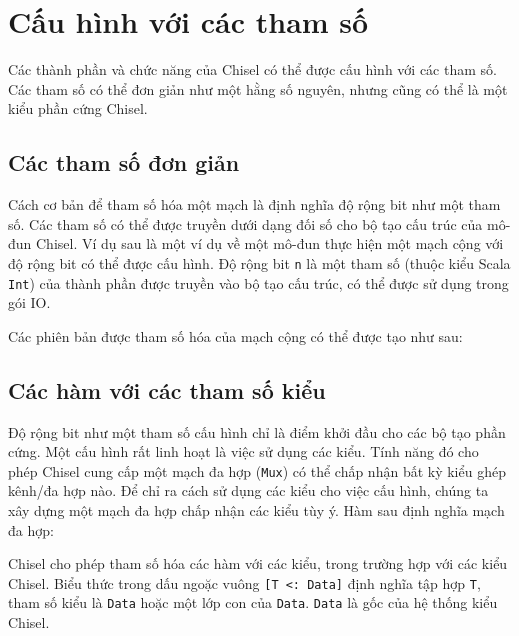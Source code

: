 \documentclass[%
    10pt,
    headinclude, footexclude,
    openright, %
    notitlepage,
    cleardoubleempty,
    headsepline,
    pointlessnumbers,
    bibtotoc, idxtotoc,
    ]{scrbook}
\newcommand{\code}[1]{{\small{\texttt{#1}}}}
\begin{document}

\section{Cấu hình với các tham số}

Các thành phần và chức năng của Chisel có thể được cấu hình với các tham số. Các tham số có thể đơn giản như một hằng số nguyên, nhưng cũng có thể là một kiểu phần cứng Chisel. 

\subsection{Các tham số đơn giản}

Cách cơ bản để tham số hóa một mạch là định nghĩa độ rộng bit như một tham số. Các tham số có thể được truyền dưới dạng đối số cho bộ tạo cấu trúc của mô-đun Chisel. Ví dụ sau là một ví dụ về một mô-đun thực hiện một mạch cộng với độ rộng bit có thể được cấu hình. Độ rộng bit \code{n} là một tham số (thuộc kiểu Scala \code{Int}) của thành phần được truyền vào bộ tạo cấu trúc, có thể được sử dụng trong gói IO. 


\noindent Các phiên bản được tham số hóa của mạch cộng có thể được tạo như sau:


\subsection{Các hàm với các tham số kiểu}

Độ rộng bit như một tham số cấu hình chỉ là điểm khởi đầu cho các bộ tạo phần cứng. Một cấu hình rất linh hoạt là việc sử dụng các kiểu. Tính năng đó cho phép Chisel cung cấp một mạch đa hợp (\code{Mux}) có thể chấp nhận bất kỳ kiểu ghép kênh/đa hợp nào. Để chỉ ra cách sử dụng các kiểu cho việc cấu hình, chúng ta xây dựng một mạch đa hợp chấp nhận các kiểu tùy ý. Hàm sau định nghĩa mạch đa hợp: 


Chisel cho phép tham số hóa các hàm với các kiểu, trong trường hợp với các kiểu Chisel. Biểu thức trong dấu ngoặc vuông \code{[T <: Data]} định nghĩa tập hợp \code{T}, tham số kiểu là \code{Data} hoặc một lớp con của \code{Data}. \code{Data} là gốc của hệ thống kiểu Chisel.
\end{document}
